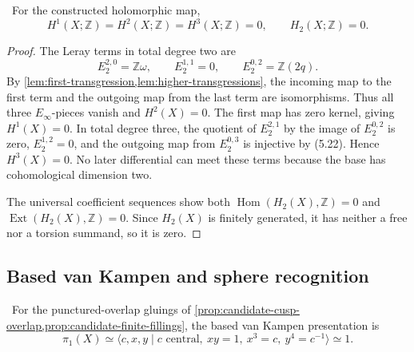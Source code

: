 \begin{theorem}
\label{thm:h2-vanishing}
\Verified\ For the constructed holomorphic map,
\[
 H^1(X;\mathbb Z)=H^2(X;\mathbb Z)=H^3(X;\mathbb Z)=0,
 \qquad H_2(X;\mathbb Z)=0.
\tag{5.23}
\]
\end{theorem}

\begin{proof}
The Leray terms in total degree two are
\[
E_2^{2,0}=\mathbb Z\omega,\qquad E_2^{1,1}=0,\qquad
E_2^{0,2}=\mathbb Z(2q).
\]
By \cref{lem:first-transgression,lem:higher-transgressions}, the incoming
map to the first term and the outgoing map from the last term are
isomorphisms.  Thus all three \(E_\infty\)-pieces vanish and \(H^2(X)=0\).
The first map has zero kernel, giving \(H^1(X)=0\).  In total degree three,
the quotient of \(E_2^{2,1}\) by the image of \(E_2^{0,2}\) is zero,
\(E_2^{1,2}=0\), and the outgoing map from \(E_2^{0,3}\) is injective by
(5.22).  Hence \(H^3(X)=0\).  No later differential can meet these terms
because the base has cohomological dimension two.

The universal coefficient sequences show both
\(\operatorname{Hom}(H_2(X),\mathbb Z)=0\) and
\(\operatorname{Ext}(H_2(X),\mathbb Z)=0\).  Since \(H_2(X)\) is finitely
generated, it has neither a free nor a torsion summand, so it is zero.
\end{proof}

\subsection{Based van Kampen and sphere recognition}

\begin{proposition}
\label{prop:geometric-pi1}
\Verified\ For the punctured-overlap gluings of
\cref{prop:candidate-cusp-overlap,prop:candidate-finite-fillings}, the based
van Kampen presentation is
\[
 \pi_1(X)\simeq
 \langle c,x,y\mid c\text{ central},\ xy=1,\ x^3=c,\ y^4=c^{-1}\rangle
 \simeq1.
\tag{5.24}
\]
\end{proposition}

